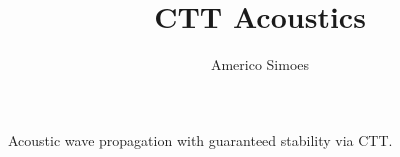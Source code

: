 \documentclass[12pt]{article}
\begin{document}
\title{CTT Acoustics}
\author{Americo Simoes}
\maketitle
Acoustic wave propagation with guaranteed stability via CTT.
\end{document}
